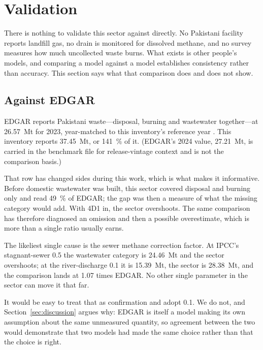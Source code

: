 \section{Validation}
\label{sec:validation}

There is nothing to validate this sector against directly. No Pakistani facility reports
landfill gas, no drain is monitored for dissolved methane, and no survey measures how much
uncollected waste burns. What exists is other people's models, and comparing a model against a
model establishes consistency rather than accuracy. This section says what that comparison
does and does not show.

\subsection{Against EDGAR}

EDGAR reports Pakistani waste---disposal, burning and wastewater together---at
\SI{26.57}{\mega\tonne} \COe{} for 2023, year-matched to this inventory's reference year
\citep{edgar2025booklet}. This inventory reports \SI{37.45}{\mega\tonne}, or
\SI{141}{\percent} of it. (EDGAR's 2024 value, \SI{27.21}{\mega\tonne}, is carried in the
benchmark file for release-vintage context and is not the comparison basis.)

That row has changed sides during this work, which is what makes it informative. Before
domestic wastewater was built, this sector covered disposal and burning only and read
\SI{49}{\percent} of EDGAR; the gap was then a measure of what the missing category would add.
With 4D1 in, the sector overshoots. The same comparison has therefore diagnosed an omission
and then a possible overestimate, which is more than a single ratio usually earns.

The likeliest single cause is the sewer methane correction factor. At IPCC's stagnant-sewer
\num{0.5} the wastewater category is \SI{24.46}{\mega\tonne} and the sector overshoots; at the
river-discharge \num{0.1} it is \SI{15.39}{\mega\tonne}, the sector is
\SI{28.38}{\mega\tonne}, and the comparison lands at \num{1.07} times EDGAR. No other single
parameter in the sector can move it that far.

It would be easy to treat that as confirmation and adopt \num{0.1}. We do not, and
Section~\ref{sec:discussion} argues why: EDGAR is itself a model making its own assumption
about the same unmeasured quantity, so agreement between the two would demonstrate that two
models had made the same choice rather than that the choice is right.

